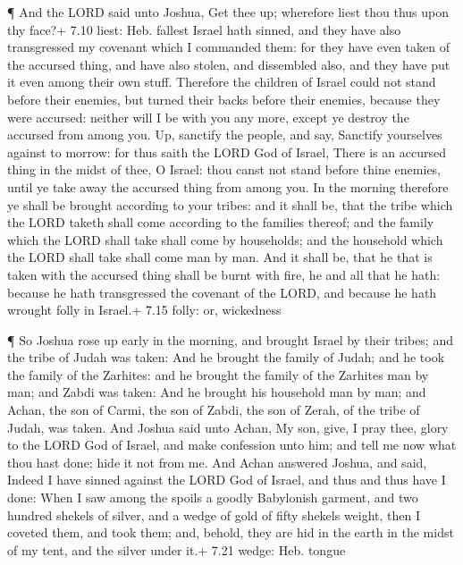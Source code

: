 ¶ And the LORD said unto Joshua, Get thee up; wherefore
liest thou thus upon thy face?+ 7.10 liest: Heb. fallest 
Israel hath sinned, and they have also transgressed my covenant which I
commanded them: for they have even taken of the accursed thing, and have
also stolen, and dissembled also, and they have put it even among their
own stuff.  Therefore the children of Israel could not
stand before their enemies, but turned their backs before their enemies,
because they were accursed: neither will I be with you any more, except
ye destroy the accursed from among you.  Up, sanctify the
people, and say, Sanctify yourselves against to morrow: for thus saith
the LORD God of Israel, There is an accursed thing in the midst of thee,
O Israel: thou canst not stand before thine enemies, until ye take away
the accursed thing from among you.  In the morning
therefore ye shall be brought according to your tribes: and it shall be,
that the tribe which the LORD taketh shall come according to the
families thereof; and the family which the LORD shall take shall come by
households; and the household which the LORD shall take shall come man
by man.  And it shall be, that he that is taken with the
accursed thing shall be burnt with fire, he and all that he hath:
because he hath transgressed the covenant of the LORD, and because he
hath wrought folly in Israel.+ 7.15 folly: or, wickedness

 ¶ So Joshua rose up early in the morning, and brought
Israel by their tribes; and the tribe of Judah was taken: 
And he brought the family of Judah; and he took the family of the
Zarhites: and he brought the family of the Zarhites man by man; and
Zabdi was taken:  And he brought his household man by man;
and Achan, the son of Carmi, the son of Zabdi, the son of Zerah, of the
tribe of Judah, was taken.  And Joshua said unto Achan, My
son, give, I pray thee, glory to the LORD God of Israel, and make
confession unto him; and tell me now what thou hast done; hide it not
from me.  And Achan answered Joshua, and said, Indeed I
have sinned against the LORD God of Israel, and thus and thus have I
done:  When I saw among the spoils a goodly Babylonish
garment, and two hundred shekels of silver, and a wedge of gold of fifty
shekels weight, then I coveted them, and took them; and, behold, they
are hid in the earth in the midst of my tent, and the silver under it.+
7.21 wedge: Heb. tongue

